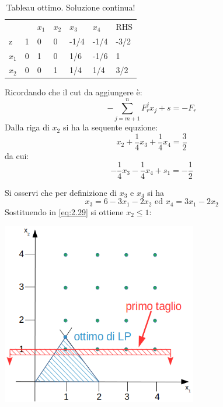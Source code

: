 \begin{table}[!h]
	\centering
	\begin{tabular}{lllllll}
				&                         & $x_{1}$ & $x_{2}$  & $x_{3}$ & $x_{4}$ &  RHS  \\ \cline{2-7}
			z	& \multicolumn{1}{|l|}{1} & 0       & 0        & -1/4    & -1/4    & \multicolumn{1}{|l|}{-3/2} \\ \cline{2-7}
		$x_{1}$ & \multicolumn{1}{|l|}{0} & 1       & 0        & 1/6     & -1/6    & \multicolumn{1}{|l|}{1} \\
		$x_{2}$ & \multicolumn{1}{|l|}{0} & 0       & 1        & 1/4     & 1/4     & \multicolumn{1}{|l|}{3/2} \\ \cline{2-7}
	\end{tabular}
	\caption{Tableau ottimo. Soluzione continua!}
\end{table}

Ricordando che il cut da aggiungere è:
\begin{equation}
-\displaystyle\sum_{j=m+1}^{n} F_{r}^{j} x_{j} + s = -F_{r}
\end{equation}
Dalla riga di $x_{2}$ si ha la sequente equzione:
\begin{equation}
	x_{2} + \frac{1}{4} x_{3} + \frac{1}{4} x_{4} = \frac{3}{2}
\end{equation}
da cui:
\begin{equation}\label{eq:2.29}
-\frac{1}{4}x_{3} - \frac{1}{4} x_{4} + s_{1} = -\frac{1}{2} 
\end{equation}

Si osservi che per definizione di $x_{3}$ e $x_{4}$ si ha
\begin{equation}
x_{3} = 6 - 3x_{1} - 2x_{2}\text{ ed }x_{4} = 3x_{1} - 2x_{2}
\end{equation}
\newpage
Sostituendo in \ref{eq:2.29} si ottiene $x_{2}\le 1$:

\centerline{\includegraphics[height=8cm]{images/graph13.png}}

